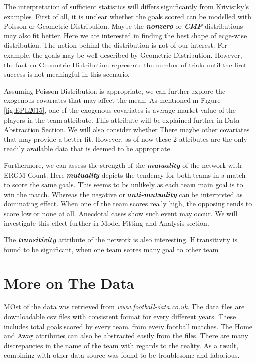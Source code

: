 \documentclass[12pt,a4paper,twoside,openany]{book}
\newcommand{\BI}[1]{\textit{\textbf{#1}}}
\begin{document}
The interpretation of sufficient statistics will differs significantly from Krivistky's examples. 
First of all, it is unclear whether the goals scored can be modelled with Poisson or Geometric Distribution.
Maybe the \BI{nonzero} or \BI{CMP} distributions may also fit better. 
Here we are interested in finding the best shape of edge-wise distribution.
The notion behind the distribution is not of our interest.
For example, the goals may be well described by Geometric Distribution. 
However, the fact on Geometric Distribution represents the number of trials until the first success is not meaningful in this scenario.

Assuming Poisson Distribution is appropriate, we can further explore the exogenous covariates that may affect the mean. 
As mentioned in Figure \ref{fig:EPL2015}, one of the exogenous covariates is average market value of the players in the team attribute. 
This attribute will be explained further in Data Abstraction Section.
We will also consider whether 
There maybe other covariates that may provide a better fit.
However, as of now these 2 attributes are the only readily available data that is deemed to be appropriate.

Furthermore, we can assess the strength of the \BI{mutuality} of the network with ERGM Count.
Here \BI{mutuality} depicts the tendency for both teams in a match to score the same goals.
This seems to be unlikely as each team main goal is to win the match. 
Whereas the negative or \BI{anti-mutuality} can be interpreted as dominating effect.
When one of the team scores really high, the opposing tends to score low or none at all.
Anecdotal cases show such event may occur. 
We will investigate this effect further in Model Fitting and Analysis section.

The \BI{transitivity} attribute of the network is also interesting. 
If transitivity is found to be significant, when one team scores many goal to other team  

\section{More on The Data}
MOst of the data was retrieved from \textit{www.football-data.co.uk}.
The data files are downloadable csv files with consistent format for every different years.
These includes total goals scored by every team, from every football matches. 
The Home and Away attributes can also be abstracted easily from the files. 
There are many discrepancies in the name of the team with regards to the reality.
As a result, combining with other data source was found to be troublesome and laborious.
\end{document}
